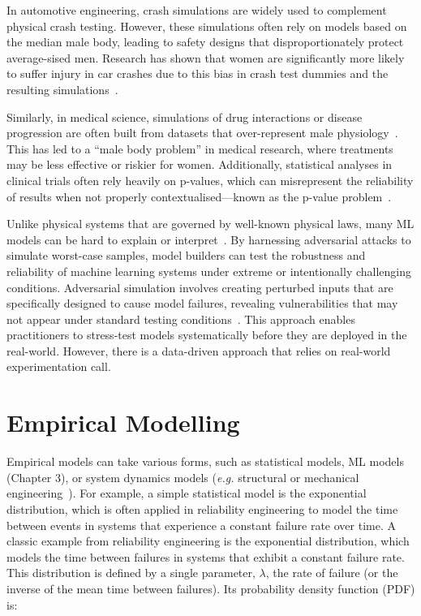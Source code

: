 In automotive engineering, crash simulations are widely used to complement physical crash testing. 
However, these simulations often rely on models based on the median male body, leading to safety designs that disproportionately protect average-sised men. Research has shown that women are significantly more likely to suffer injury in car crashes due to this bias in crash test dummies and the resulting simulations~\cite{crashgenderbias}.

Similarly, in medical science, simulations of drug interactions or disease progression are often built from datasets that over-represent male physiology~\cite{merone2022sex}. 
This has led to a ``male body problem'' in medical research, where treatments may be less effective or riskier for women. 
Additionally, statistical analyses in clinical trials often rely heavily on p-values, which can misrepresent the reliability of results when not properly contextualised---known as the p-value problem~\cite{goodman1993p}.

Unlike physical systems that are governed by well-known physical laws, many ML models can be hard to explain or interpret~\cite{explainable}. 
By harnessing adversarial attacks to simulate worst-case samples, model builders can test the robustness and reliability of machine learning systems under extreme or intentionally challenging conditions.
Adversarial simulation involves creating perturbed inputs that are specifically designed to cause model failures, revealing vulnerabilities that may not appear under standard testing conditions~\cite{fgm}.
This approach enables practitioners to stress-test models systematically before they are deployed in the real-world. 
However, there is a data-driven approach that relies on real-world experimentation call.

\section{Empirical Modelling}

Empirical models can take various forms, such as statistical models, ML models (Chapter 3), or system dynamics models (\textit{e.g.} structural or mechanical engineering~\cite{structural_eng}). 
For example, a simple statistical model is the exponential distribution, which is often applied in reliability engineering to model the time between events in systems that experience a constant failure rate over time.
A classic example from reliability engineering is the exponential distribution, which models the time between failures in systems that exhibit a constant failure rate. 
This distribution is defined by a single parameter, $\lambda$, the rate of failure (or the inverse of the mean time between failures). 
Its probability density function (PDF) is:

